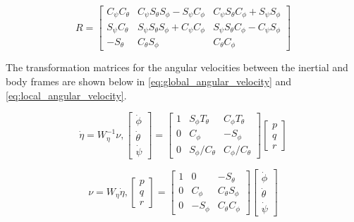 \documentclass[letterpaper,12pt,titlepage,oneside,final]{book}
\begin{document}
\begin{equation} \label{eq:rotation_matrix}
R = 
\begin{bmatrix}
C_{\psi}C_{\theta} & C_{\psi}S_{\theta}S_{\phi} - S_{\psi}C_{\phi} & C_{\psi}S_{\theta}C_{\phi} + S_{\psi}S_{\phi} \\
S_{\psi}C_{\theta} & S_{\psi}S_{\theta}S_{\phi} + C_{\psi}C_{\phi} & S_{\psi}S_{\theta}C_{\phi} - C_{\psi}S_{\phi} \\
-S_{\theta} & C_{\theta}S_{\phi} & C_{\theta}C_{\phi}
\end{bmatrix}
\end{equation}

The transformation matrices for the angular velocities between the inertial and body frames are shown below in \eqref{eq:global_angular_velocity} and \eqref{eq:local_angular_velocity}.

\begin{equation} \label{eq:global_angular_velocity}
\dot{\eta} = W_{\eta}^{-1}\nu, 
\begin{bmatrix}
\dot{\phi} \\
\dot{\theta} \\
\dot{\psi}
\end{bmatrix}
=
\begin{bmatrix}
1 & S_{\phi}T_{\theta} & C_{\phi}T_{\theta} \\
0 & C_{\phi} & -S_{\phi} \\
0 & S_{\phi}/C_{\theta} & C_{\phi}/C_{\theta}
\end{bmatrix}
\begin{bmatrix}
p \\
q \\
r
\end{bmatrix}
\end{equation}

\begin{equation} \label{eq:local_angular_velocity}
\nu = W_{\eta}\dot{\eta},
\begin{bmatrix}
p \\
q \\
r
\end{bmatrix}
=
\begin{bmatrix}
1 & 0 & -S_{\theta} \\
0 & C_{\phi} & C_{\theta}S_{\phi} \\
0 & -S_{\phi} & C_{\theta}C_{\phi}
\end{bmatrix}
\begin{bmatrix}
\dot{\phi} \\
\dot{\theta} \\
\dot{\psi}
\end{bmatrix}
\end{equation}
\end{document}

